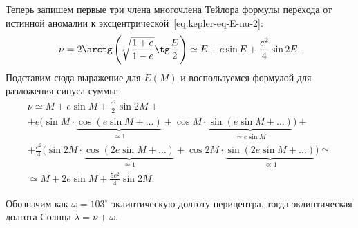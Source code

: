Теперь запишем первые три члена многочлена Тейлора формулы перехода от истинной аномалии к эксцентрической~\eqref{eq:kepler-eq-E-nu-2}:
\begin{equation*}
    \nu 
        = 2 \arctg \left(\sqrt{\frac{1+e}{1-e}} \tg \frac{E}{2} \right) 
        \simeq E + e \sin E + \frac{e^2}{4} \sin 2E.
\end{equation*}
Подставим сюда выражение для $E(M)$ и воспользуемся формулой для разложения синуса суммы:
\begin{multline*}
    \nu 
        \simeq M + e \sin M + \frac{e^2}{2} \sin 2M + \\
        + e \bigg( \sin M \cdot \underbrace{\cos (e \sin M + \ldots)}_{\simeq 1} + \cos M \cdot \underbrace{\sin ( e \sin M  + \ldots )}_{\simeq e \sin M} \bigg) + \\
        + \frac{e^2}{4} \bigg( \sin 2M \cdot \underbrace{\cos (2e \sin M + \ldots)}_{\simeq 1} + \cos 2M \cdot \underbrace{\sin (2e \sin M + \ldots)}_{\ll 1}\bigg)  \simeq \\
        \simeq M + 2e \sin M + \frac{5e^2}{4} \sin 2M.
\end{multline*}

Обозначим как $\omega = 103^\circ$ эклиптическую долготу перицентра, тогда эклиптическая долгота Солнца $\lambda = \nu + \omega$. 

